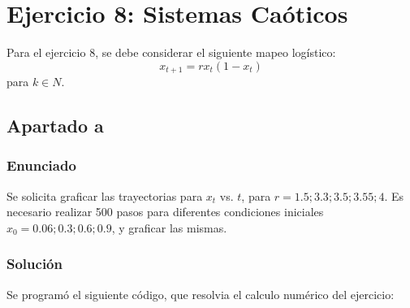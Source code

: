 \documentclass[a4paper,10pt]{paper}
\begin{document}
\section{Ejercicio 8: Sistemas Ca\'oticos}
Para el ejercicio 8, se debe considerar el siguiente mapeo log\'{i}stico:
\begin{displaymath}
 x_{t+1} = r x_t (1 - x_t)
\end{displaymath}
para $k \in N$.
\subsection{Apartado a}
\subsubsection{Enunciado}
Se solicita graficar las trayectorias para $x_t$ vs. $t$, para $r = 1.5; 3.3; 3.5; 3.55; 4$. 
Es necesario realizar 500 pasos para diferentes condiciones iniciales $x_0 = 0.06; 0.3; 0.6; 0.9$, 
y graficar las mismas.
\subsubsection{Soluci\'on}
Se program\'o el siguiente c\'odigo, que resolvia el calculo num\'erico del ejercicio:
\inputminted[firstline=16, linenos, firstnumber=1]{fortran}{../8/ej8a.f90}
\end{document}
